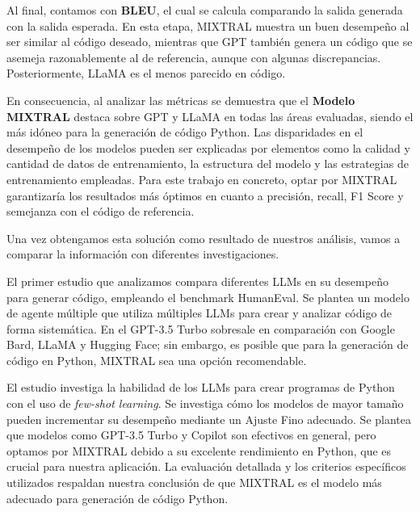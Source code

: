 \bigskip %

Al final, contamos con \textbf{\acrshort{BLEU}}, el cual se calcula comparando la salida generada con la salida esperada. En esta etapa, MIXTRAL muestra un buen desempeño al ser similar al código deseado, mientras que \acrshort{GPT} también genera un código que se asemeja razonablemente al de referencia, aunque con algunas discrepancias. Posteriormente, \acrshort{LLaMA} es el menos parecido en código.

\bigskip %

En consecuencia, al analizar las métricas se demuestra que el \textbf{Modelo MIXTRAL} destaca sobre \acrshort{GPT} y \acrshort{LLaMA} en todas las áreas evaluadas, siendo el más idóneo para la generación de código Python. Las disparidades en el desempeño de los modelos pueden ser explicadas por elementos como la calidad y cantidad de datos de entrenamiento, la estructura del modelo y las estrategias de entrenamiento empleadas. Para este trabajo en concreto, optar por MIXTRAL garantizaría los resultados más óptimos en cuanto a precisión, recall, F1 Score y semejanza con el código de referencia.

\bigskip %

Una vez obtengamos esta solución como resultado de nuestros análisis, vamos a comparar la información con diferentes investigaciones.

\bigskip %

El primer estudio \cite{estudio1} que analizamos compara diferentes \acrfull{LLMs} en su desempeño para generar código, empleando el benchmark HumanEval. Se plantea un modelo de agente múltiple que utiliza múltiples \acrshort{LLMs} para crear y analizar código de forma sistemática. En el \acrshort{GPT}-3.5 Turbo sobresale en comparación con Google Bard, \acrshort{LLaMA} y Hugging Face; sin embargo, es posible que para la generación de código en Python, MIXTRAL sea una opción recomendable.

\bigskip %

El estudio \cite{estudio2} investiga la habilidad de los \acrshort{LLMs} para crear programas de Python con el uso de \textit{\gls{few-shot learning}}. Se investiga cómo los modelos de mayor tamaño pueden incrementar su desempeño mediante un Ajuste Fino adecuado. Se plantea que modelos como \acrshort{GPT}-3.5 Turbo y Copilot son efectivos en general, pero optamos por MIXTRAL debido a su excelente rendimiento en Python, que es crucial para nuestra aplicación. La evaluación detallada y los criterios específicos utilizados respaldan nuestra conclusión de que MIXTRAL es el modelo más adecuado para generación de código Python.

